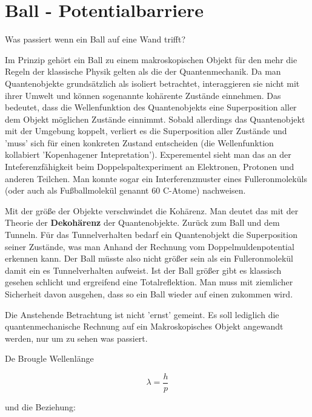 



\section*{Ball - Potentialbarriere}

Was passiert wenn ein Ball auf eine Wand trifft?

Im Prinzip gehört ein Ball zu einem makroskopischen Objekt für den mehr die Regeln der klassische Physik gelten als die der Quantenmechanik. Da man Quantenobjekte grundsätzlich als isoliert betrachtet, interaggieren sie nicht mit ihrer Umwelt und können sogenannte kohärente Zustände einnehmen. Das bedeutet, dass die Wellenfunktion des Quantenobjekts eine Superposition aller dem Objekt möglichen Zustände einnimmt. Sobald allerdings das Quantenobjekt mit der Umgebung koppelt, verliert es die Superposition aller Zustände und 'muss' sich für einen konkreten Zustand entscheiden (die Wellenfunktion kollabiert 'Kopenhagener Intepretation'). Experementel sieht man das an der Inteferenzfähigkeit beim Doppelspaltexperiment an Elektronen, Protonen und anderen Teilchen. Man konnte sogar ein Interferenzmuster eines Fulleronmoleküls (oder auch als Fußballmolekül genannt 60 C-Atome) nachweisen. 

Mit der größe der Objekte verschwindet die Kohärenz. Man deutet das mit der Theorie der \textbf{Dekohärenz} der Quantenobjekte. Zurück zum Ball und dem Tunneln. Für das Tunnelverhalten bedarf ein Quantenobjekt die Superposition seiner Zustände, was man Anhand der Rechnung vom Doppelmuldenpotential erkennen kann. Der Ball müsste also nicht größer sein als ein Fulleronmolekül damit ein es Tunnelverhalten aufweist. Ist der Ball größer gibt es klassisch gesehen schlicht und ergreifend eine Totalreflektion. Man muss mit ziemlicher Sicherheit davon ausgehen, dass so ein Ball wieder auf einen zukommen wird.

Die Anstehende Betrachtung ist nicht 'ernst' gemeint. Es soll lediglich die quantenmechanische Rechnung auf ein Makroskopisches Objekt angewandt werden, nur um zu sehen was passiert.

De Brougle Wellenlänge

\begin{equation} 
\label{eq:1}
\lambda = \frac{h}{p}  
\end{equation}

und die Beziehung:

